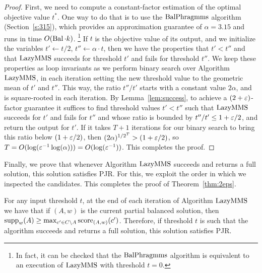 \begin{proof}
First, we need to compute a constant-factor estimation of the optimal objective value $t^*$. 
One way to do that is to use the $\operatorname{BalPhragmms}$ algorithm (Section~\ref{s:315}), which provides an approximation guarantee of $\alpha=3.15$ and runs in time $O(\operatorname{Bal}\cdot k)$.%
\footnote{In fact, it can be checked that the $\operatorname{BalPhragmms}$ algorithm is equivalent to an execution of $\operatorname{LazyMMS}$ with threshold $t=0$.} 
If $t$ is the objective value of its output, and we initialize the variables $t'\leftarrow t/2$, $t''\leftarrow \alpha\cdot t$, then we have the properties that $t'<t''$ and that $\operatorname{LazyMMS}$ succeeds for threshold $t'$ and fails for threshold $t''$. We keep these properties as loop invariants as we perform binary search over Algorithm $\operatorname{LazyMMS}$, in each iteration setting the new threshold value to the geometric mean of $t'$ and $t''$. This way, the ratio $t''/t'$ starts with a constant value $2 \alpha$, and is square-rooted in each iteration. 
By Lemma~\ref{lem:success}, to achieve a $(2+\varepsilon)$-factor guarantee it suffices to find threshold values $t'<t''$ such that $\operatorname{LazyMMS}$ succeeds for $t'$ and fails for $t''$ and whose ratio is bounded by $t''/t'\leq 1+\varepsilon/2$, and return the output for $t'$. If it takes $T+1$ iterations for our binary search to bring this ratio below $(1+\varepsilon/2)$, then $(2\alpha)^{1/2^T} > (1+\varepsilon/2)$, so $T= O(\log (\varepsilon^{-1} \log(\alpha))) = O(\log(\varepsilon^{-1}))$. This completes the proof. 
\end{proof}

Finally, we prove that whenever Algorithm $\operatorname{LazyMMS}$ succeeds and returns a full solution, this solution satisfies PJR. For this, we exploit the order in which we inspected the candidates. This completes the proof of Theorem~\ref{thm:2eps}. 

\begin{lemma}
For any input threshold $t$, at the end of each iteration of Algorithm $\operatorname{LazyMMS}$ we have that if $(A,w)$ is the current partial balanced solution, then $\operatorname{supp}_w(A)\geq \max_{c'\in C\setminus A} \operatorname{score}_{(A,w)}(c')$. 
Therefore, if threshold $t$ is such that the algorithm succeeds and returns a full solution, this solution satisfies PJR.
\end{lemma}

